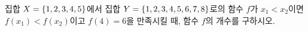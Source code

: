 집합 $X=\{1{,}\mkern3mu\mathopen{}2{,}\mkern3mu\mathopen{}3{,}\mkern3mu\mathopen{}4{,}\mkern3mu\mathopen{}5\}$에서 집합 $Y=\{1{,}\mkern3mu\mathopen{}2{,}\mkern3mu\mathopen{}3{,}\mkern3mu\mathopen{}4{,}\mkern3mu\mathopen{}5{,}\mkern3mu\mathopen{}6{,}\mkern3mu\mathopen{}7{,}\mkern3mu\mathopen{}8\}$로의 함수 $f$가 $x_1<x_2$이면 $f(x_1)<f(x_2)$이고 $f(4)=6$을 만족시킬 때, 함수 $f$의 개수를 구하시오. 
